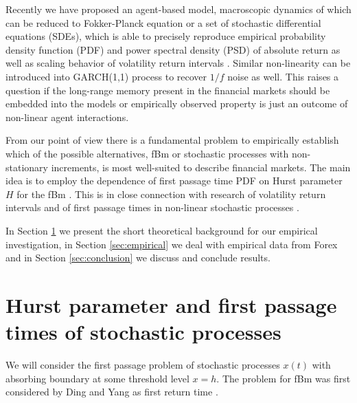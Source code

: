 \documentclass{article}
\begin{document}
Recently we have proposed an agent-based model, macroscopic dynamics of which can be reduced to Fokker-Planck equation or a set of stochastic differential equations (SDEs), which is able to precisely reproduce empirical probability density function (PDF) and power spectral density (PSD) of absolute return \cite{Kononovicius2013EPL,Gontis2014PlosOne} as well as scaling behavior of volatility return intervals \cite{Gontis2016PhysA}. Similar non-linearity can be introduced into GARCH(1,1) process \cite{Kononovicius2015PhysA} to recover $1/f$ noise as well. This raises a question if the long-range memory present in the financial markets should be embedded into the models or empirically observed property is just an outcome of non-linear agent interactions.

From our point of view there is a fundamental problem to empirically establish which of the possible alternatives, fBm or stochastic processes with non-stationary increments, is most well-suited to describe financial markets. The main idea is to employ the dependence of first passage time PDF on Hurst parameter $H$ for the fBm \cite{Ding1995PhysRevE,Metzler2014Springer}. This is in close connection with research of volatility return intervals \cite{Yamasaki2005PNAS,Wang2006PhysRevE,Wang2008PhysRevE,Bunde2011EPL,Bunde2014PRE,Gontis2008PhysA} and of first passage times in non-linear stochastic processes \cite{Gontis2012ACS}.

In Section \ref{sec:hurst-first-passage} we present the short theoretical background for our empirical investigation, in Section \ref{sec:empirical} we deal with empirical data from Forex and in Section \ref{sec:conclusion} we discuss and conclude results.

\section{Hurst parameter and first passage times of stochastic processes}
\label{sec:hurst-first-passage}

We will consider the first passage problem of stochastic processes $x(t)$ with absorbing boundary at some threshold level $x=h$. The problem for fBm was first considered by Ding and Yang as first return time \cite{Ding1995PhysRevE}.
 
\end{document}
